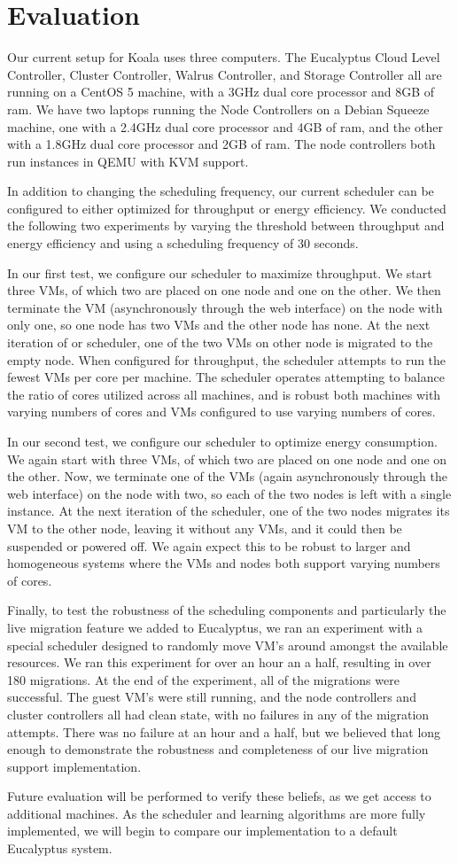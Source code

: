 \section{Evaluation}

Our current setup for Koala uses three computers.  The Eucalyptus Cloud Level Controller, Cluster Controller, Walrus Controller, and Storage Controller all are running on a CentOS 5 machine, with a 3GHz dual core processor and 8GB of ram.  We have two laptops running the Node Controllers on a Debian Squeeze machine, one with a 2.4GHz dual core processor and 4GB of ram, and the other with a 1.8GHz dual core processor and 2GB of ram.  The node controllers both run instances in QEMU with KVM support.  

In addition to changing the scheduling frequency, our current scheduler can be configured to either optimized for throughput or energy efficiency.  We conducted the following two experiments by varying the threshold between throughput and energy efficiency and using a scheduling frequency of 30 seconds.

In our first test, we configure our scheduler to maximize throughput.  We start three VMs, of which two are placed on one node and one on the other.  We then terminate the VM (asynchronously through the web interface) on the node with only one, so one node has two VMs and the other node has none.  At the next iteration of or scheduler, one of the two VMs on other node is migrated to the empty node.  When configured for throughput, the scheduler attempts to run the fewest VMs per core per machine.  The scheduler operates attempting to balance the ratio of cores utilized across all machines, and is robust both machines with varying numbers of cores and VMs configured to use varying numbers of cores.

In our second test, we configure our scheduler to optimize energy consumption.  We again start with three VMs, of which two are placed on one node and one on the other.  Now, we terminate one of the VMs (again asynchronously through the web interface) on the node with two, so each of the two nodes is left with a single instance.  At the next iteration of the scheduler, one of the two nodes migrates its VM to the other node, leaving it without any VMs, and it could then be suspended or powered off.  We again expect this to be robust to larger and homogeneous systems where the VMs and nodes both support varying numbers of cores.

Finally, to test the robustness of the scheduling components and particularly the live migration feature we added to Eucalyptus, we ran an experiment with a special scheduler designed to randomly move VM's around amongst the available resources.  We ran this experiment for over an hour an a half, resulting in over 180 migrations.  At the end of the experiment, all of the migrations were successful.  The guest VM's were still running, and the node controllers and cluster controllers all had clean state, with no failures in any of the migration attempts.  There was no failure at an hour and a half, but we believed that long enough to demonstrate the robustness and completeness of our live migration support implementation.

Future evaluation will be performed to verify these beliefs, as we get access to additional machines.  As the scheduler and learning algorithms are more fully implemented, we will begin to compare our implementation to a default Eucalyptus system.

